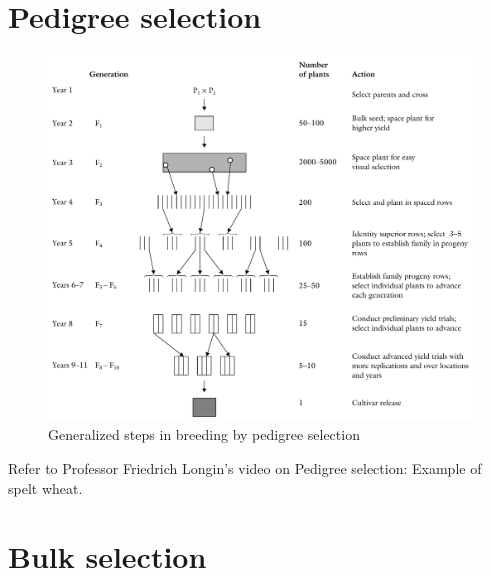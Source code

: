 \documentclass[11pt,ignorenonframetext,aspectratio=169]{beamer}
\begin{document}
\hypertarget{pedigree-selection}{%
\section{Pedigree selection}\label{pedigree-selection}}

\begin{frame}{}
\protect\hypertarget{section-11}{}
\begin{figure}

{\centering \includegraphics[width=0.64\linewidth]{./images/pedigree_selection} 

}

\caption{Generalized steps in breeding by pedigree selection}\label{fig:pedigree-selection}
\end{figure}
\end{frame}

\begin{frame}{}
\protect\hypertarget{section-12}{}
Refer to Professor Friedrich Longin's video on Pedigree selection:
Example of spelt wheat.
\end{frame}

\hypertarget{bulk-selection}{%
\section{Bulk selection}\label{bulk-selection}}
\end{document}
